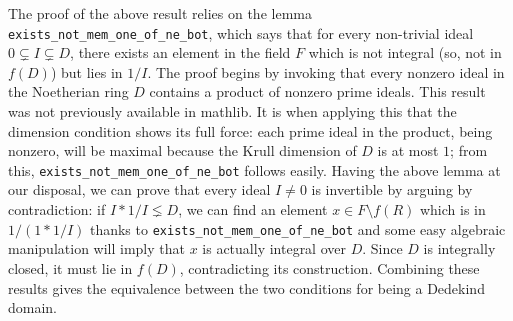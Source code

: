 \documentclass[a4paper,USenglish,cleveref, autoref, thm-restate]{lipics-v2021}
\newcommand{\lean}[1]{\texttt{#1}\xspace} %
\newcommand{\mathlib}{\textsf{mathlib}\xspace}
\begin{document}
The proof of the above result relies on the lemma \lean{exists\_not\_mem\_one\_of\_ne\_bot}, which says that for every non-trivial ideal $0\subsetneq I\subsetneq D$, there exists an element in the field $F$ which is not integral (so, not in $f(D)$) but lies in $1/I$. The proof begins by invoking that every nonzero ideal in the Noetherian ring $D$ contains a product of nonzero prime ideals. This result was not previously available in \mathlib. %
It is when applying this that the dimension condition shows its full force: each prime ideal in the product, being nonzero, will be maximal because the Krull dimension of $D$ is at most $1$; from this, \lean{exists\_not\_mem\_one\_of\_ne\_bot} follows easily. Having the above lemma at our disposal, we can prove that every ideal $I\ne 0$ is invertible by arguing by contradiction: if $I\ast 1/I\lneq D$, we can find an element $x\in F\setminus f(R)$ which is in $1/(1\ast 1/I)$ thanks to \lean{exists\_not\_mem\_one\_of\_ne\_bot} and some easy algebraic manipulation will imply that $x$ is actually integral over $D$. Since $D$ is integrally closed, it must lie in $f(D)$, contradicting its construction. Combining these results gives the equivalence between the two conditions for being a Dedekind domain.

\end{document}
